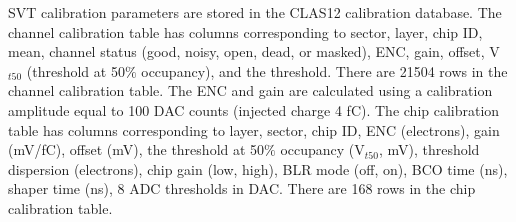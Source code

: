 SVT calibration parameters are stored in the CLAS12 calibration database. The channel calibration table has columns corresponding to sector, layer, chip ID, mean, channel status (good, noisy, open, dead, or masked), ENC, gain, offset, V$_{t50}$ (threshold at 50$\%$ occupancy), and the threshold. There are 21504 rows in the channel calibration table. The ENC and gain are calculated using a calibration amplitude equal to 100 DAC counts (injected charge 4 fC).
The chip calibration table has columns corresponding to layer, sector, chip ID, ENC (electrons), gain (mV/fC), offset (mV), the threshold at 50$\%$ occupancy (V$_{t50}$, mV), threshold dispersion (electrons), chip gain (low, high), BLR mode (off, on), BCO time (ns), shaper time (ns), 8 ADC thresholds in DAC. There are 168 rows in the chip calibration table. 


